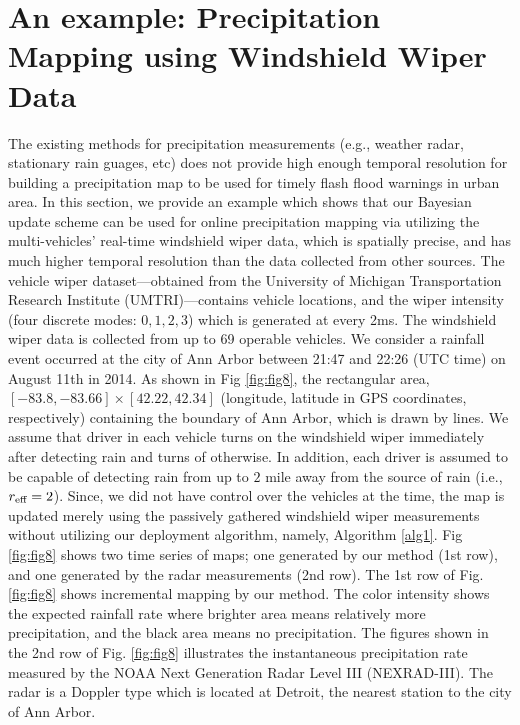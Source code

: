 \documentclass[journal]{IEEEtran}
\begin{document}
\section{An example: Precipitation Mapping using Windshield Wiper Data}
\label{sec:sec8}
The existing methods for precipitation measurements (e.g., weather radar, stationary rain guages, etc) does not provide high enough temporal resolution for building a precipitation map to be used for timely flash flood warnings in urban area. In this section, we provide an example which shows that our Bayesian update scheme can be used for online precipitation mapping via utilizing the multi-vehicles' real-time windshield wiper data, which is spatially precise, and has much higher temporal resolution than the data collected from other sources.
The vehicle wiper dataset---obtained from the University
of Michigan Transportation Research Institute
(UMTRI)---contains vehicle locations, and the wiper
intensity (four discrete modes: $0,1,2,3$) which is generated at every 2ms. The windshield wiper data is collected from up to 69 operable vehicles. 
 We consider a rainfall event occurred at the city of Ann Arbor between 21:47 and 22:26 (UTC time) on August 11th in 2014. As shown in Fig \ref{fig:fig8}, the rectangular area, $[-83.8,-83.66] \times [42.22,42.34]$ (longitude, latitude in GPS coordinates, respectively) containing the boundary of Ann Arbor, which is drawn by lines. We assume that driver in each vehicle turns on the windshield wiper immediately after detecting rain and turns of otherwise. In addition, each driver is assumed to be capable of detecting rain from up to $2$ mile away from the source of rain (i.e., $r_{\textup{eff}} = 2$). Since, we did not have control over the vehicles at the time, the map is updated merely using the passively gathered windshield wiper measurements without utilizing our deployment algorithm, namely, Algorithm \ref{alg1}. 
Fig \ref{fig:fig8} shows two time series of maps; one generated by our method (1st row), and one generated by the radar measurements (2nd row).
The 1st row of Fig. \ref{fig:fig8} shows incremental mapping by our method. The color intensity shows the expected rainfall rate where brighter area means relatively more precipitation, and the black area means no precipitation.
The figures shown in the 2nd row of Fig. \ref{fig:fig8} illustrates the instantaneous precipitation rate measured by the 
NOAA Next Generation Radar Level III (NEXRAD-III).
The radar is a Doppler type which is located at Detroit, the nearest station to the city of Ann Arbor. 
\end{document}
